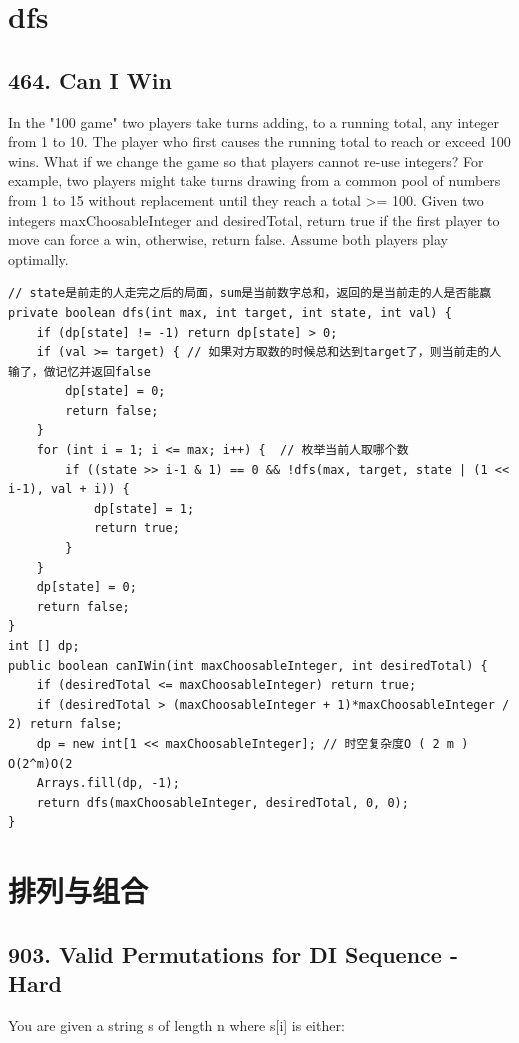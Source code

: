\documentclass[9pt, b5paaper]{book}
\begin{document}
\chapter{dfs}
\label{sec-4}
\section{464. Can I Win}
\label{sec-4-1}
In the "100 game" two players take turns adding, to a running total, any integer from 1 to 10. The player who first causes the running total to reach or exceed 100 wins.
What if we change the game so that players cannot re-use integers?
For example, two players might take turns drawing from a common pool of numbers from 1 to 15 without replacement until they reach a total >= 100.
Given two integers maxChoosableInteger and desiredTotal, return true if the first player to move can force a win, otherwise, return false. Assume both players play optimally.
\begin{verbatim}
// state是前走的人走完之后的局面，sum是当前数字总和，返回的是当前走的人是否能赢
private boolean dfs(int max, int target, int state, int val) {
    if (dp[state] != -1) return dp[state] > 0;
    if (val >= target) { // 如果对方取数的时候总和达到target了，则当前走的人输了，做记忆并返回false
        dp[state] = 0;
        return false;
    }
    for (int i = 1; i <= max; i++) {  // 枚举当前人取哪个数
        if ((state >> i-1 & 1) == 0 && !dfs(max, target, state | (1 << i-1), val + i)) {
            dp[state] = 1;
            return true;
        }
    }
    dp[state] = 0;
    return false;
}
int [] dp;
public boolean canIWin(int maxChoosableInteger, int desiredTotal) {
    if (desiredTotal <= maxChoosableInteger) return true;
    if (desiredTotal > (maxChoosableInteger + 1)*maxChoosableInteger / 2) return false;
    dp = new int[1 << maxChoosableInteger]; // 时空复杂度O ( 2 m ) O(2^m)O(2 
    Arrays.fill(dp, -1);
    return dfs(maxChoosableInteger, desiredTotal, 0, 0);
}
\end{verbatim}


\chapter{排列与组合}
\label{sec-5}
\section{903. Valid Permutations for DI Sequence - Hard}
\label{sec-5-1}
You are given a string s of length n where s[i] is either:
\end{document}
